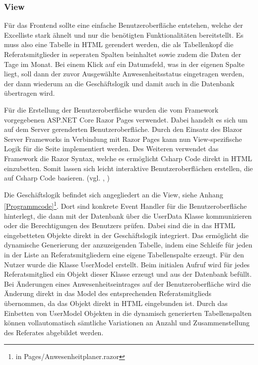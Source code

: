 \subsubsection{View}
\label{sec:View}
Für das Frontend sollte eine einfache Benutzeroberfläche entstehen, welche der Excelliste stark ähnelt und nur die benötigten Funktionalitäten bereitstellt. Es muss also eine Tabelle in HTML gerendert werden, die als Tabellenkopf die Referatsmitglieder in seperaten Spalten beinhaltet sowie zudem die Daten der Tage im Monat. Bei einem Klick auf ein Datumsfeld, was in der eigenen Spalte liegt, soll dann der zuvor Ausgewählte Anwesenheitsstatus eingetragen werden, der dann wiederum an die Geschäftslogik und damit auch in die Datenbank übertragen wird.

Für die Erstellung der Benutzeroberfläche wurden die vom Framework vorgegebenen ASP.NET Core Razor Pages verwendet. Dabei handelt es sich um auf dem Server gerenderten Benutzeroberfläche. Durch den Einsatz des Blazor Server Frameworks in Verbindung mit Razor Pages kann nun View-spezifische Logik für die Seite implementiert werden. Des Weiteren verwendet das Framework die Razor Syntax, welche es ermöglicht Csharp Code direkt in HTML einzubetten. Somit lassen sich leicht interaktive Benutzeroberflächen erstellen, die auf Csharp Code basieren. (vgl. \cite{Razor}, \cite{RazorSyntax})

Die Geschäftslogik befindet sich angegliedert an die View, siehe Anhang \ref{Programmcode}\footnote{in Pages/Anwesenheitplaner.razor}. Dort sind konkrete Event Handler für die Benutzeroberfläche hinterlegt, die dann \zB mit der Datenbank über die UserData Klasse kommunizieren oder die Berechtigungen des Benutzers prüfen. Dabei sind die in das HTML eingebetteten Objekte direkt in der Geschäftslogik integriert. Das ermöglicht die dynamische Generierung der anzuzeigenden Tabelle, indem eine Schleife für jeden in der Liste an Referatsmitgliedern eine eigene Tabellenspalte erzeugt. Für den Nutzer wurde die Klasse UserModel erstellt. Beim initialen Aufruf wird für jedes Referatsmitglied ein Objekt dieser Klasse erzeugt und aus der Datenbank befüllt. Bei Änderungen eines Anwesenheitseintrages auf der Benutzeroberfläche wird die Änderung direkt in das Model des entsprechenden Referatsmitglieds übernommen, da das Objekt direkt in HTML eingebunden ist. Durch das Einbetten von UserModel Objekten in die dynamisch generierten Tabellenspalten können vollautomatisch sämtliche Variationen an Anzahl und Zusammenstellung des Referates abgebildet werden. %


